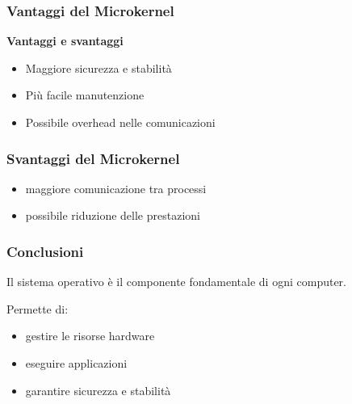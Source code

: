 \documentclass{beamer}
\begin{document}

\begin{frame}
	\frametitle{Vantaggi del Microkernel}
	
		
	\textbf{Vantaggi e svantaggi}
	\begin{itemize}
		\item Maggiore sicurezza e stabilità
		\item Più facile manutenzione
		\item Possibile overhead nelle comunicazioni
	\end{itemize}

\end{frame}


\begin{frame}
	\frametitle{Svantaggi del Microkernel}
	
	\begin{itemize}
		\item maggiore comunicazione tra processi
		\item possibile riduzione delle prestazioni
	\end{itemize}
	
\end{frame}



\begin{frame}
	\frametitle{Conclusioni}
	
	Il sistema operativo è il componente
	fondamentale di ogni computer.
	
	Permette di:
	
	\begin{itemize}
		\item gestire le risorse hardware
		\item eseguire applicazioni
		\item garantire sicurezza e stabilità
	\end{itemize}
	
\end{frame}
	
	
\end{document}
